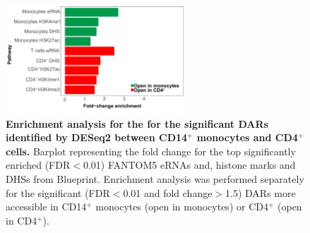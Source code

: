 \begin{figure}[h]
\centering
\includegraphics[width=0.6\textwidth]{./Results1/pdfs/ATAC_CD4vsCD14_deseq_features_enrichment_barplot}
\caption[Enrichment analysis for the significant DARs identified by DESeq2 between CD14$^+$ monocytes and CD4$^+$ cells.]{\textbf{Enrichment analysis for the for the significant DARs identified by DESeq2 between CD14$^+$ monocytes and CD4$^+$ cells.} Barplot representing the fold change for the top significantly enriched (FDR$<$0.01) FANTOM5 eRNAs and, histone marks and DHSs from Blueprint. Enrichment analysis was performed separately for the significant (FDR$<$0.01 and fold change$>$1.5) DARs more accessible in CD14$^+$ monocytes (open in monocytes) or CD4$^+$ (open in CD4$^+$).}
\label{figure:Enrichment_analysis_of_DARs_by_DESeq2}
\end{figure} 



%

